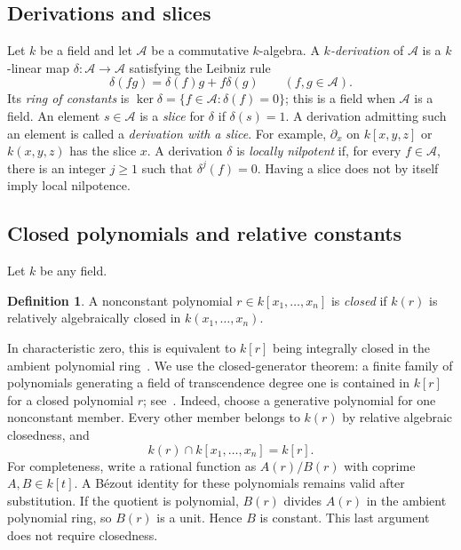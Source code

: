 \documentclass[11pt,reqno]{amsart}
\theoremstyle{definition}
\newtheorem{definition}[theorem]{Definition}
\theoremstyle{remark}
\numberwithin{equation}{section}
\begin{document}
\subsection{Derivations and slices}
Let $k$ be a field and let $\mathcal A$ be a commutative $k$-algebra. A \emph{$k$-derivation} of $\mathcal A$ is a $k$-linear map $\delta\colon\mathcal A\to\mathcal A$ satisfying the Leibniz rule
\[
 \delta(fg)=\delta(f)g+f\delta(g)\qquad(f,g\in\mathcal A).
\]
Its \emph{ring of constants} is $\ker\delta=\{f\in\mathcal A:\delta(f)=0\}$; this is a field when $\mathcal A$ is a field. An element $s\in\mathcal A$ is a \emph{slice} for $\delta$ if $\delta(s)=1$. A derivation admitting such an element is called a \emph{derivation with a slice}. For example, $\partial_x$ on $k[x,y,z]$ or $k(x,y,z)$ has the slice $x$.
A derivation $\delta$ is \emph{locally nilpotent} if, for every $f\in\mathcal A$, there is an integer $j\geq1$ such that $\delta^j(f)=0$. Having a slice does not by itself imply local nilpotence. 

\subsection{Closed polynomials and relative constants}
Let $k$ be any field.
\begin{definition}\label{def:closed}
A nonconstant polynomial $r\in k[x_1,\ldots,x_n]$ is \emph{closed} if $k(r)$ is relatively algebraically closed in $k(x_1,\ldots,x_n)$.
\end{definition}

In characteristic zero, this is equivalent to $k[r]$ being integrally closed in the ambient polynomial ring~\cite[Lemma~3]{ArzhantsevPetravchuk}. We use the closed-generator theorem: a finite family of polynomials generating a field of transcendence degree one is contained in $k[r]$ for a closed polynomial $r$; see~\cite{ArzhantsevPetravchuk}. Indeed, choose a generative polynomial for one nonconstant member. Every other member belongs to $k(r)$ by relative algebraic closedness, and
\begin{equation}\label{eq:intersection}
 k(r)\cap k[x_1,\ldots,x_n]=k[r].
\end{equation}
For completeness, write a rational function as $A(r)/B(r)$ with coprime $A,B\in k[t]$. A B\'ezout identity for these polynomials remains valid after substitution. If the quotient is polynomial, $B(r)$ divides $A(r)$ in the ambient polynomial ring, so $B(r)$ is a unit. Hence $B$ is constant. This last argument does not require closedness.
\end{document}
